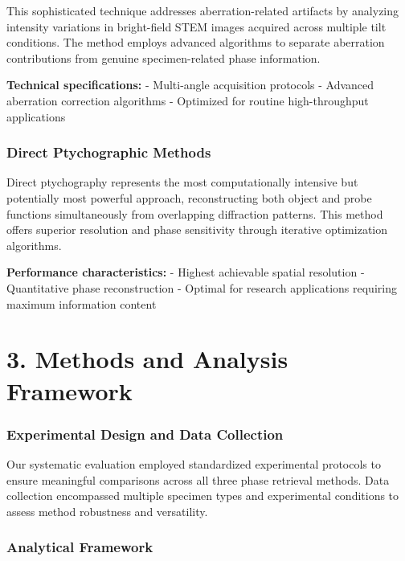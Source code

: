 \documentclass[
  letterpaper,
]{article}
\begin{document}
This sophisticated technique addresses aberration-related artifacts by
analyzing intensity variations in bright-field STEM images acquired
across multiple tilt conditions. The method employs advanced algorithms
to separate aberration contributions from genuine specimen-related phase
information.

\textbf{Technical specifications:} - Multi-angle acquisition protocols -
Advanced aberration correction algorithms - Optimized for routine
high-throughput applications

\subsection{Direct Ptychographic
Methods}\label{direct-ptychographic-methods}

Direct ptychography represents the most computationally intensive but
potentially most powerful approach, reconstructing both object and probe
functions simultaneously from overlapping diffraction patterns. This
method offers superior resolution and phase sensitivity through
iterative optimization algorithms.

\textbf{Performance characteristics:} - Highest achievable spatial
resolution - Quantitative phase reconstruction - Optimal for research
applications requiring maximum information content


\chapter{3. Methods and Analysis
Framework}\label{methods-and-analysis-framework}

\subsection{Experimental Design and Data
Collection}\label{experimental-design-and-data-collection}

Our systematic evaluation employed standardized experimental protocols
to ensure meaningful comparisons across all three phase retrieval
methods. Data collection encompassed multiple specimen types and
experimental conditions to assess method robustness and versatility.

\subsection{Analytical Framework}\label{analytical-framework-1}
\end{document}
